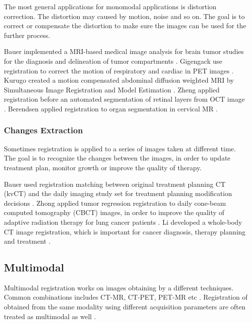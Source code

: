 \documentclass{IEEEtran}
\begin{document}
  The most general applications for monomodal applications is distortion correction. The distortion may caused by motion, noise and so on. The goal is to correct or compensate the distortion to make sure the images can be used for the further process.

  Bauer implemented a MRI-based medical image analysis for brain tumor studies for the diagnosis and delineation of tumor compartments \cite{bauer2013survey}. Gigengack use registration to correct the motion of respiratory and cardiac in PET images \cite{gigengack2012motion}. Kurugo created a motion compensated abdominal diffusion weighted MRI by Simultaneous Image Registration and Model Estimation \cite{kurugol2015motion}. Zheng applied registration before an automated segmentation of retinal layers from OCT image \cite{zheng2013generative}. Berendsen applied registration to organ segmentation in cervical MR \cite{berendsen2013free}.

  \subsubsection{Changes Extraction}

  Sometimes registration is applied to a series of images taken at different time. The goal is to recognize the changes between the images, in order to update treatment plan, monitor growth or improve the quality of therapy.

  Bauer used registration matching between original treatment planning CT (kvCT) and the daily imaging study set for treatment planning modification decisions \cite{varadhan2013framework}. Zhong applied tumor regression registration to daily cone-beam computed tomography (CBCT) images, in order to improve the quality of adaptive radiation therapy for lung cancer patients \cite{zhong2015morphological}. Li developed a whole-body CT image registration, which is important for cancer diagnosis, therapy planning and treatment \cite{li2015patient}.


  \subsection{Multimodal}

  Multimodal registration works on images obtaining by a different techniques. Common combinations includes CT-MR, CT-PET, PET-MR etc \cite{maintz1998survey}. Registration of obtained from the same modality using different acquisition parameters are often treated as multimodal as well \cite{oliveira2014medical}.
\end{document}
